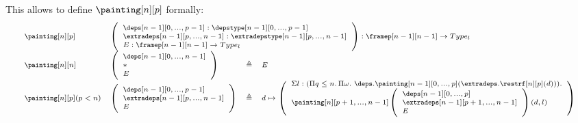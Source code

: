 \documentclass{msc}
\newcommand{\unitpoint}{\ensuremath{\ast}}
\newcommand{\defeq}{\ensuremath{\triangleq}}
\begin{document}
This allows to define $\painting[n][p]$ formally:
\begin{equation*}
  \fontsize{7.2}{9}\selectfont
  \begin{array}{llcl}
    \painting[n][p]               &
    \multicolumn{3}{l}{
      \left(\begin{array}{l}
                \deps[n-1][0,...,p-1]:\depstype[n-1][0,...,p-1]           \\
                \extradeps[n-1][p,...,n-1]:\extradepstype[n-1][p,...,n-1] \\
                E:\framep[n-1][n-1]\rightarrow Type_l                     \\
              \end{array}\right) : \framep[n-1][n-1]\rightarrow Type_l
    }                                                                            \\
    \painting[n][n]               &
    \left(\begin{array}{l}
              \deps[n-1][0,...,n-1] \\
              \unitpoint            \\
              E                     \\
            \end{array}\right)      & \defeq & E                                   \\
    \painting[n][p](p<n)          &
    \left(\begin{array}{l}
              \deps[n-1][0,...,p-1]      \\
              \extradeps[n-1][p,...,n-1] \\
              E                          \\
            \end{array}\right) & \defeq & d \mapsto
    \left(\begin{array}{l}
              \Sigma l:(\Pi q\leq n.\,\Pi \omega.\
              \deps.\painting[n-1][0,...,p](\extradeps.\restrf[n][p](d))). \\
              \painting[n][p+1,...,n-1]
              \left(\begin{array}{l}
                  \deps[n-1][0,...,p]          \\
                  \extradeps[n-1][p+1,...,n-1] \\
                  E                            \\
                \end{array}\right)(d,l)                           \\
            \end{array}\right) \\
  \end{array}
\end{equation*}
\end{document}

